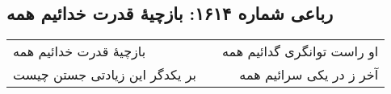 \begin{center}
\section*{رباعی شماره ۱۶۱۴: بازچیهٔ قدرت خدائیم همه}
\label{sec:1614}
\begin{longtable}{l p{0.5cm} r}
بازچیهٔ قدرت خدائیم همه
&&
او راست توانگری گدائیم همه
\\
بر یکدگر این زیادتی جستن چیست
&&
آخر ز در یکی سرائیم همه
\\
\end{longtable}
\end{center}
